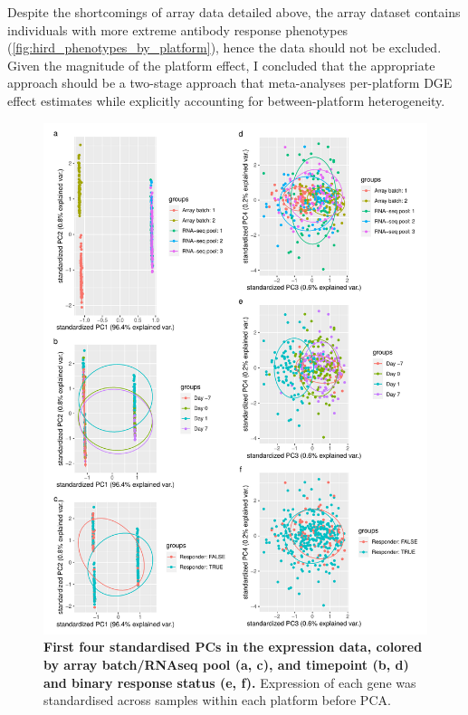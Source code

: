Despite the shortcomings of array data detailed above, the array dataset contains individuals with more extreme antibody response phenotypes (\cref{fig:hird_phenotypes_by_platform}), hence the data should not be excluded.
Given the magnitude of the platform effect, I concluded that the appropriate approach should be a two-stage approach that meta-analyses per-platform \gls{DGE} effect estimates while explicitly accounting for between-platform heterogeneity.

\begin{figure}
    \includegraphics[width=1.0\textwidth,page=1]{mainmatter/figures/chapter_02/compare_phenotype_by_platform.E_pca.pdf}
    \caption{
        \textbf{First four standardised \glspl{PC} in the expression data, colored by array batch/\gls{RNAseq} pool (a, c), and timepoint (b, d) and binary response status (e, f).}
        Expression of each gene was standardised across samples within each platform before \gls{PCA}.
    }
    \label{fig:hird_expression_pcs}
\end{figure}


